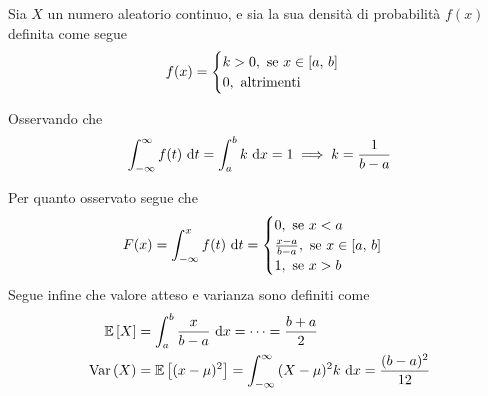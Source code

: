 \documentclass{subfiles}
\begin{document}
Sia \(X\) un numero aleatorio continuo, e sia la sua densità di probabilità \(f(x)\) definita come segue
\[
    f(x) = \begin{cases}
        k > 0, \text{se} x \in \Range*{a}{b} \\
        0, \text{altrimenti}
    \end{cases}\]
\begin{Remark*}
    Osservando che
    \[
        \Int{f(t)}{t}[-\infty][\infty] = \Int{k}{x}[a][b] = 1   \implies k = \Frac{1}{b - a}
    \]
\end{Remark*}
Per quanto osservato segue che
\[
    F(x) = \Int{f(t)}{t}[-\infty][x] = \begin{cases}
        0, \text{se} x < a                                 \\
        \Frac{x - a}{b - a}, \text{se} x \in \Range*{a}{b} \\
        1, \text{se} x > b
    \end{cases}\]
Segue infine che valore atteso e varianza sono definiti come
\[\begin{aligned}
        \Expected*{X} & = \Int{\Frac{x}{b - a}}{x}[a][b] = \cdots = \Frac{b + a}{2}                                      \\
        \Var{X}       & = \Expected*{(x - \mu)^{2}} = \Int{(X - \mu)^{2} k}{x}[-\infty][\infty] = \Frac{(b - a)^{2}}{12}
    \end{aligned}\]
\end{document}
